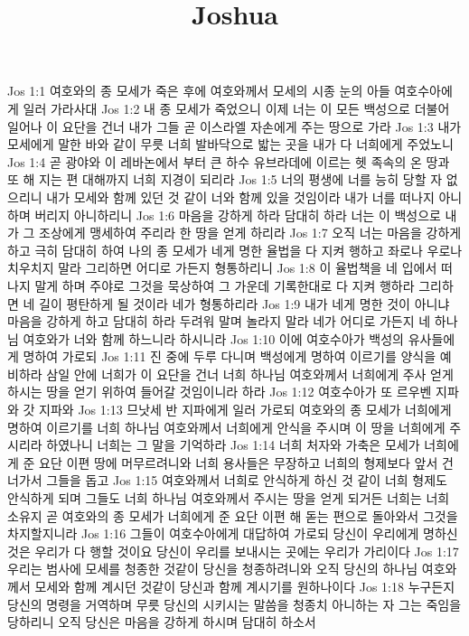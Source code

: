 

\title{Joshua}

Jos 1:1  여호와의 종 모세가 죽은 후에 여호와께서 모세의 시종 눈의 아들 여호수아에게 일러 가라사대
Jos 1:2  내 종 모세가 죽었으니 이제 너는 이 모든 백성으로 더불어 일어나 이 요단을 건너 내가 그들 곧 이스라엘 자손에게 주는 땅으로 가라
Jos 1:3  내가 모세에게 말한 바와 같이 무릇 너희 발바닥으로 밟는 곳을 내가 다 너희에게 주었노니
Jos 1:4  곧 광야와 이 레바논에서 부터 큰 하수 유브라데에 이르는 헷 족속의 온 땅과 또 해 지는 편 대해까지 너희 지경이 되리라
Jos 1:5  너의 평생에 너를 능히 당할 자 없으리니 내가 모세와 함께 있던 것 같이 너와 함께 있을 것임이라 내가 너를 떠나지 아니하며 버리지 아니하리니
Jos 1:6  마음을 강하게 하라 담대히 하라 너는 이 백성으로 내가 그 조상에게 맹세하여 주리라 한 땅을 얻게 하리라
Jos 1:7  오직 너는 마음을 강하게 하고 극히 담대히 하여 나의 종 모세가 네게 명한 율법을 다 지켜 행하고 좌로나 우로나 치우치지 말라 그리하면 어디로 가든지 형통하리니
Jos 1:8  이 율법책을 네 입에서 떠나지 말게 하며 주야로 그것을 묵상하여 그 가운데 기록한대로 다 지켜 행하라 그리하면 네 길이 평탄하게 될 것이라 네가 형통하리라
Jos 1:9  내가 네게 명한 것이 아니냐 마음을 강하게 하고 담대히 하라 두려워 말며 놀라지 말라 네가 어디로 가든지 네 하나님 여호와가 너와 함께 하느니라 하시니라
Jos 1:10  이에 여호수아가 백성의 유사들에게 명하여 가로되
Jos 1:11  진 중에 두루 다니며 백성에게 명하여 이르기를 양식을 예비하라 삼일 안에 너희가 이 요단을 건너 너희 하나님 여호와께서 너희에게 주사 얻게 하시는 땅을 얻기 위하여 들어갈 것임이니라 하라
Jos 1:12  여호수아가 또 르우벤 지파와 갓 지파와
Jos 1:13  므낫세 반 지파에게 일러 가로되 여호와의 종 모세가 너희에게 명하여 이르기를 너희 하나님 여호와께서 너희에게 안식을 주시며 이 땅을 너희에게 주시리라 하였나니 너희는 그 말을 기억하라
Jos 1:14  너희 처자와 가축은 모세가 너희에게 준 요단 이편 땅에 머무르려니와 너희 용사들은 무장하고 너희의 형제보다 앞서 건너가서 그들을 돕고
Jos 1:15  여호와께서 너희로 안식하게 하신 것 같이 너희 형제도 안식하게 되며 그들도 너희 하나님 여호와께서 주시는 땅을 얻게 되거든 너희는 너희 소유지 곧 여호와의 종 모세가 너희에게 준 요단 이편 해 돋는 편으로 돌아와서 그것을 차지할지니라
Jos 1:16  그들이 여호수아에게 대답하여 가로되 당신이 우리에게 명하신 것은 우리가 다 행할 것이요 당신이 우리를 보내시는 곳에는 우리가 가리이다
Jos 1:17  우리는 범사에 모세를 청종한 것같이 당신을 청종하려니와 오직 당신의 하나님 여호와께서 모세와 함께 계시던 것같이 당신과 함께 계시기를 원하나이다
Jos 1:18  누구든지 당신의 명령을 거역하며 무릇 당신의 시키시는 말씀을 청종치 아니하는 자 그는 죽임을 당하리니 오직 당신은 마음을 강하게 하시며 담대히 하소서
